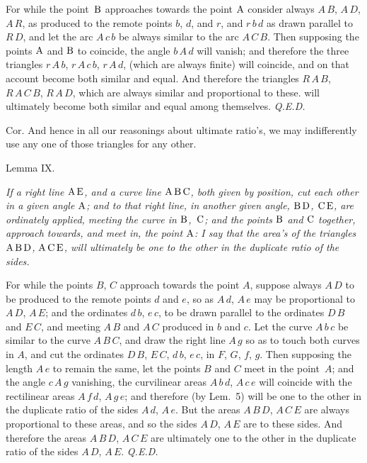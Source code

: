 \midinsert
\centerline{}
\endinsert

\bigbreak

For while the point~${\rm B}$ approaches towards the point
${\rm A}$ consider always $A \, B$, $A \, D$, $A \, R$, as
produced to the remote points $b$, $d$, and $r$,
and $r \, b \, d$ as drawn parallel to $R \, D$, and
let the arc $A \, c \, b$ be always similar to the arc
$A \, C \, B$.  Then supposing the points ${\rm A}$ and ${\rm B}$
to coincide, the angle $b \, A \, d$ will vanish; and therefore
the three triangles
$r \, A \, b$, $r \, A \, c \, b$, $r \, A \, d$,
(which are always finite) will coincide, and on that account
become both similar and equal.  And therefore the triangles
$R \, A \, B$, $R \, A \, C \, B$, $R \, A \, D$, which are
always similar and proportional to these.  will ultimately become
both similar and equal among themselves.
{\it Q.E.D.}

{\sc Cor.}
And hence in all our reasonings about ultimate ratio's, we may
indifferently use any one of those triangles for any other.

\bigbreak

\centerline{\largesc Lemma IX.}

\nobreak\bigskip

{\it
If a right line ${\rm A} \, {\rm E}$, and a curve line
${\rm A} \, {\rm B} \, {\rm C}$,
both given by position, cut each other in a given angle ${\rm
A}$; and to that right line, in another given angle,
${\rm B} \, {\rm D}$, ${\rm C} \, {\rm E}$,
are ordinately applied, meeting the curve in
${\rm B}$,~${\rm C}$; and the points ${\rm B}$ and ${\rm C}$
together, approach towards, and meet in, the point ${\rm A}$: I
say that the area's of the triangles
${\rm A} \, {\rm B} \, {\rm D}$,
${\rm A} \, {\rm C} \, {\rm E}$,
will ultimately be one to the other in the duplicate ratio of the
sides.}

\midinsert
\centerline{}
\endinsert

\bigbreak

For while the points $B$, $C$ approach towards the
point $A$, suppose always $A \, D$ to be produced to the
remote points $d$ and $e$, so as $A \, d$, $A \, e$
may be proportional to $A \, D$, $A \, E$; and the ordinates
$d \, b$, $e \, c$, to be drawn parallel to the ordinates
$D \, B$ and $E \, C$, and meeting $A \, B$ and $A \, C$ produced
in $b$ and $c$.  Let the curve $A \, b \, c$ be
similar to the curve $A \, B \, C$, and draw the right line
$A \, g$ so as to touch both curves in $A$, and cut the
ordinates $D \, B$, $E \, C$, $d \, b$, $e \, c$, in $F$,
$G$, $f$, $g$.  Then supposing the length
$A \, e$ to remain the same, let the points $B$ and
$C$ meet in the point~$A$; and the angle
$c \, A \, g$ vanishing, the curvilinear areas $A \, b \, d$,
$A \, c \, e$ will coincide with the rectilinear areas
$A \, f \, d$, $A \, g \, e$; and therefore (by Lem.~5) will be
one to the other in the duplicate ratio of the sides $A \, d$,
$A \, e$.  But the areas $A \, B \, D$, $A \, C \, E$ are always
proportional to these areas, and so the sides $A \, D$, $A \, E$
are to these sides.  And therefore the areas
$A \, B \, D$, $A \, C \, E$ are ultimately one to the other in
the duplicate ratio of the sides $A \, D$, $A \, E$.
{\it Q.E.D.}

